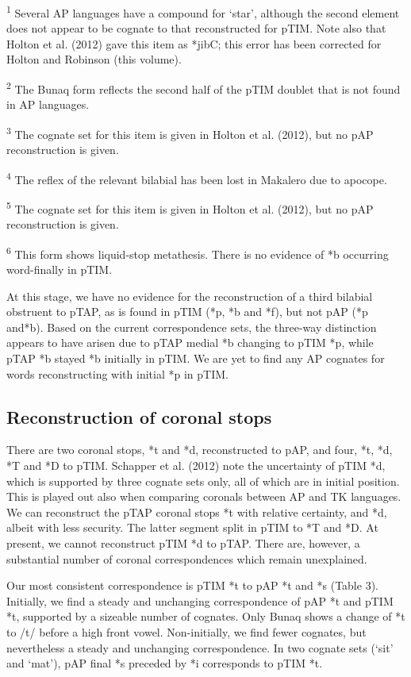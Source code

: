 \documentclass[a4paper]{article}
\begin{document}
\textsuperscript{1} Several AP languages have a compound for {\textquoteleft}star{\textquoteright}, although the second element does not appear to be cognate to that reconstructed for pTIM. Note also that Holton et al. (2012) gave this item as *jibC; this error has been corrected for Holton and Robinson (this volume).

\textsuperscript{2 }The Bunaq form reflects the second half of the pTIM doublet that is not found in AP languages.

\textsuperscript{3} The cognate set for this item is given in Holton et al. (2012), but no pAP reconstruction is given.

\textsuperscript{4 }The reflex of the relevant bilabial has been lost in Makalero due to apocope.

\textsuperscript{5} The cognate set for this item is given in Holton et al. (2012), but no pAP reconstruction is given.

\textsuperscript{6} This form shows liquid-stop metathesis. There is no evidence of *b occurring word-finally in pTIM.

At this stage, we have no evidence for the reconstruction of a third bilabial obstruent to pTAP, as is found in pTIM (*p, *b and *f), but not pAP (*p and*b). Based on the current correspondence sets, the three-way distinction appears to have arisen due to pTAP medial *b changing to pTIM *p, while pTAP *b stayed *b initially in pTIM. We are yet to find any AP cognates for words reconstructing with initial *p in pTIM.

\subsection[Reconstruction of coronal stops]{\textbf{Reconstruction of coronal stops}}
There are two coronal stops, *t and *d, reconstructed to pAP, and four, *t, *d, *T and *D to pTIM. Schapper et al. (2012) note the uncertainty of pTIM *d, which is supported by three cognate sets only, all of which are in initial position. This is played out also when comparing coronals between AP and TK languages. We can reconstruct the pTAP coronal stops *t with relative certainty, and *d, albeit with less security. The latter segment split in pTIM to *T and *D. At present, we cannot reconstruct pTIM *d to pTAP. There are, however, a substantial number of coronal correspondences which remain unexplained. 

Our most consistent correspondence is pTIM *t to pAP *t and *s (Table 3). Initially, we find a steady and unchanging correspondence of pAP *t and pTIM *t, supported by a sizeable number of cognates. Only Bunaq shows a change of *t to /t{\textesh}/ before a high front vowel. Non-initially, we find fewer cognates, but nevertheless a steady and unchanging correspondence. In two cognate sets ({\textquoteleft}sit{\textquoteright} and {\textquoteleft}mat{\textquoteright}), pAP final *s preceded by *i corresponds to pTIM *t.
\end{document}
